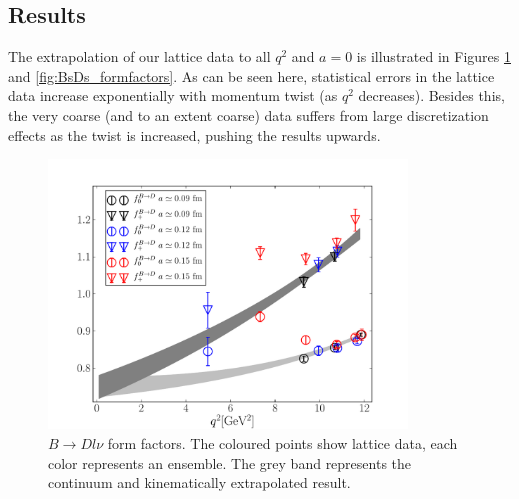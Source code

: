 \subsection{Results}


The extrapolation of our lattice data to all $q^2$ and $a=0$ is illustrated in Figures \ref{fig:BD_formfactors} and \ref{fig:BsDs_formfactors}. As can be seen here, statistical errors in the lattice data increase exponentially with momentum twist (as $q^2$ decreases). Besides this, the very coarse (and to an extent coarse) data suffers from large discretization effects as the twist is increased, pushing the results upwards.

\begin{figure}[htb!]
  \begin{center}
    \includegraphics[width=0.85\textwidth]{images/nrqcd/BD_formfactors.pdf}
  \end{center}
  \caption{$B\to Dl\nu$ form factors. The coloured points show lattice data, each color represents an ensemble. The grey band represents the continuum and kinematically extrapolated result. \label{fig:BD_formfactors}}
\end{figure}

